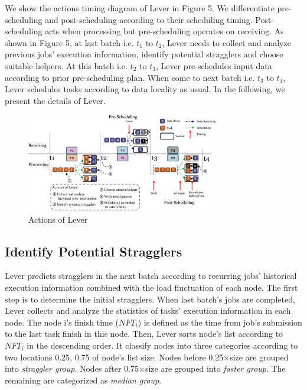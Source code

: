   We show the actions timing diagram of Lever in Figure 5. We differentiate pre-scheduling and post-scheduling according to their scheduling timing. Post-scheduling acts when processing but pre-scheduling operates on receiving. As shown in Figure 5, at last batch i.e. $t_1$ to $t_2$, Lever needs to collect and analyze previous jobs' execution information, identify potential stragglers and choose suitable helpers. At this batch i.e. $t_2$ to $t_3$, Lever pre-schedules input data according to prior pre-scheduling plan. When come to next batch i.e. $t_3$ to $t_4$, Lever schedules tasks according to data locality as usual. In the following, we present the details of Lever.
  \begin{figure}[htbp]
    \centering
    \includegraphics[width=0.75\textwidth]{FigureAction}
    \caption{Actions of Lever}
    \label{Fig. 5:}
  \end{figure}

\subsection{Identify Potential Stragglers}

  Lever predicts stragglers in the next batch according to recurring jobs' historical execution information combined with the load fluctuation of each node. The first step is to determine the initial stragglers. When last batch's jobs are completed, Lever collects and analyze the statistics of tasks' execution information in each node. The node i's finish time ($NFT_i$) is defined as the time from job's submission to the last task finish in this node. Then, Lever sorts node's list according to $NFT_i$ in the descending order. It classify nodes into three categories according to two locations 0.25, 0.75 of node's list size. Nodes before 0.25$\times$size are grouped into \emph{straggler group}. Nodes after 0.75$\times$size are grouped into \emph{faster group}. The remaining are categorized as \emph{median group}.

